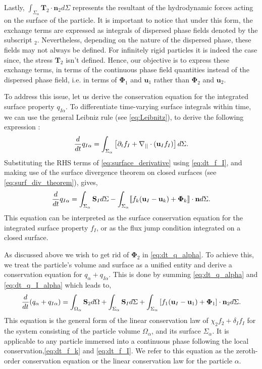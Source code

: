 Lastly, $\int_{\Sigma_\alpha} \textbf{T}_2\cdot\textbf{n}_2 d\Sigma$ represents the resultant of the hydrodynamic forces acting on the surface of the particle.
It is important to notice that under this form, the exchange terms are expressed as integrals of dispersed phase fields denoted by the subscript $_2$.
Nevertheless, depending on the nature of the dispersed phase, these fields may not always be defined.
For infinitely rigid particles it is indeed the case since, the stress $\textbf{T}_2$ isn't defined.  
Hence, our objective is to express these exchange terms, in terms of the continuous phase field quantities instead of the dispersed phase field, i.e. in terms of $\mathbf{\Phi}_1$ and $\textbf{u}_1$ rather than $\mathbf{\Phi}_2$ and $\textbf{u}_2$. 

To address this issue, let us derive the conservation equation for the integrated surface property $q_{I\alpha}$.
To differentiate time-varying surface integrals within time, we can use the general Leibniz rule (see \ref{eq:Leibnitz}), to derive the following expression :
\begin{equation}
    \frac{d}{d t}  q_{I\alpha}
    = \int_{\Sigma_\alpha} \left[
        \partial_t f_I
        +   \mathbf{\nabla}_{||} \cdot (\textbf{u}_If_I)
    \right]d\Sigma.
    \label{eq:surface_derivative}
\end{equation}
Substituting the RHS terms of \ref{eq:surface_derivative} using \ref{eq:dt_f_I}, and making use of the surface divergence theorem on closed surfaces (see \ref{eq:surf_div_theorem}), gives,
\begin{equation}
    \frac{d}{d t}  q_{I\alpha}
    = \int_{\Sigma_\alpha} 
        \textbf{S}_I
    d\Sigma
    - \int_{\Sigma_\alpha} \llbracket 
        f_k (\textbf{u}_I - \textbf{u}_k)
        + \mathbf{\Phi}_k
     \rrbracket \cdot \textbf{n}
    d\Sigma.
    \label{eq:dt_q_I_alpha}
\end{equation}
This equation can be interpreted as the surface conservation equation for the integrated surface property $f_I$, or as the flux jump condition integrated on a closed surface. 

As discussed above we wish to get rid of $\mathbf{\Phi}_2$ in \ref{eq:dt_q_alpha}. To achieve this, we treat the particle's volume and surface as a unified entity and derive a conservation equation for $q_\alpha + q_{I\alpha}$. 
This is done by summing \ref{eq:dt_q_alpha} and \ref{eq:dt_q_I_alpha} which leads to, 
\begin{equation}
    \frac{d}{d t}  (q_\alpha+q_{I\alpha})
    = 
    \int_{\Omega_\alpha} \textbf{S}_2 d\Omega
    + \int_{\Sigma_\alpha} \textbf{S}_I d\Sigma
    + \int_{\Sigma_\alpha} \left[
        f_1 (\textbf{u}_I-\textbf{u}_1) 
        + \mathbf{\Phi}_1 
        \right] \cdot \textbf{n}_2 d\Sigma. 
    \label{eq:dt_q_alpha_tot}
\end{equation}
This equation is the general form of the linear conservation law of $\chi_2 f_2 + \delta_I f_I$ for the system consisting of the particle volume $\Omega_\alpha$, and its surface $\Sigma_\alpha$. It is applicable to any particle immersed into a continuous phase following the local conservation,\ref{eq:dt_f_k} and \ref{eq:dt_f_I}.
We refer to this equation as the zeroth-order conservation equation or the linear conservation law for the particle $\alpha$.

